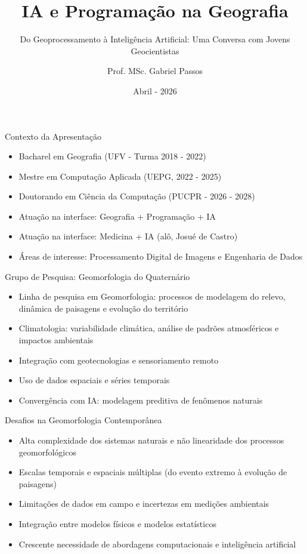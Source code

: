 \documentclass{beamer}
\title{IA e Programação na Geografia}
\subtitle{Do Geoprocessamento à Inteligência Artificial: Uma Conversa com Jovens Geocientistas}
\author{Prof. MSc. Gabriel Passos}
\institute{Pontifícia Universidade Católica do Paraná (PUCPR) \\ Universidade Federal de Viçosa (UFV) \\ Centro de Ensino Superior de Maringá (CESUMAR)}
\date{Abril - 2026}
\begin{document}
\begin{frame}
\titlepage
\end{frame}

\begin{frame}{Contexto da Apresentação}
\begin{itemize}
    \item Bacharel em Geografia (UFV - Turma 2018 - 2022)
    \item Mestre em Computação Aplicada (UEPG, 2022 - 2025)
    \item Doutorando em Ciência da Computação (PUCPR - 2026 - 2028)
    \item Atuação na interface: Geografia + Programação + IA
    \item Atuação na interface: Medicina + IA (alô, Josué de Castro)
    \item Áreas de interesse: Processamento Digital de Imagens e Engenharia de Dados 
\end{itemize}
\end{frame}

\begin{frame}{Grupo de Pesquisa: Geomorfologia do Quaternário}
\begin{itemize}
    \item Linha de pesquisa em Geomorfologia: processos de modelagem do relevo, dinâmica de paisagens e evolução do território
    \item Climatologia: variabilidade climática, análise de padrões atmosféricos e impactos ambientais
    \item Integração com geotecnologias e sensoriamento remoto
    \item Uso de dados espaciais e séries temporais
    \item Convergência com IA: modelagem preditiva de fenômenos naturais
\end{itemize}
\end{frame}

\begin{frame}{Desafios na Geomorfologia Contemporânea}
\begin{itemize}
    \item Alta complexidade dos sistemas naturais e não linearidade dos processos geomorfológicos
    \item Escalas temporais e espaciais múltiplas (do evento extremo à evolução de paisagens)
    \item Limitações de dados em campo e incertezas em medições ambientais
    \item Integração entre modelos físicos e modelos estatísticos
    \item Crescente necessidade de abordagens computacionais e inteligência artificial
\end{itemize}
\end{frame}
\end{document}
